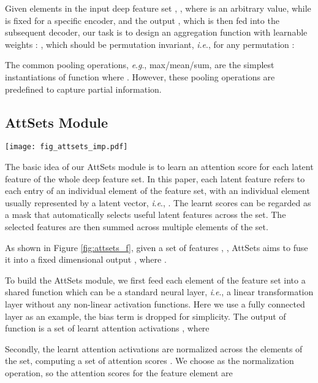 \documentclass[twocolumn]{svjour3}    \pdfoutput=1
\newcommand{\nickname}{AttSets}
\newcommand{\ie}{\textit{i}.\textit{e}., }
\newcommand{\eg}{\textit{e}.\textit{g}., }
\begin{document}
Given  elements in the input deep feature set , , where  is an arbitrary value, while  is fixed for a specific encoder, and the output , which is then fed into the subsequent decoder, our task is to design an aggregation function  with learnable weights : , which should be permutation invariant, \ie for any permutation :

The common pooling operations, \eg max/mean/sum, are the simplest instantiations of function  where . However, these pooling operations are predefined to capture partial information.

\subsection{\nickname{} Module} \label{sec:design}
\begin{figure*}[t]
\setlength{\abovecaptionskip}{ 1 pt}
\setlength{\belowcaptionskip}{ 1 pt}
\centering
   \texttt{[image: fig\_attsets\_imp.pdf]}
\caption{Implementation of \nickname{} with fully connected layer, 2D ConvNet, and 3D ConvNet. These three variants of \nickname{} can be flexibly plugged into different locations of an existing encoder-decoder network.}
\label{fig:attsets_imp}
\vspace{-0.1cm}
\end{figure*}

The basic idea of our \nickname{} module is to learn an attention score for each latent feature of the whole deep feature set. In this paper, each latent feature refers to each entry of an individual element of the feature set, with an individual element usually represented by a latent vector, \ie . The learnt scores can be regarded as a mask that automatically selects useful latent features across the set. The selected features are then summed across multiple elements of the set.

As shown in Figure \ref{fig:attsets_f}, given a set of features , , \nickname{} aims to fuse it into a fixed dimensional output , where .

To build the \nickname{} module, we first feed each element of the feature set  into a shared function  which can be a standard neural layer, \ie a linear transformation layer without any non-linear activation functions. Here we use a fully connected layer as an example, the bias term is dropped for simplicity. The output of function  is a set of learnt attention activations , where


Secondly, the learnt attention activations are normalized across the  elements of the set, computing a set of attention scores . We choose  as the normalization operation, so the attention scores for the  feature element are
\end{document}
